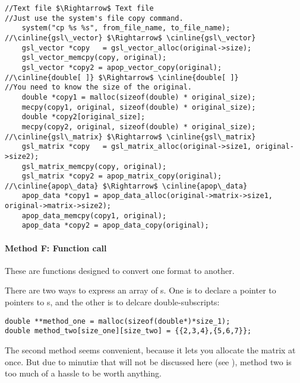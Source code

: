  
  
\begin{lstlisting}
//Text file $\Rightarrow$ Text file
//Just use the system's file copy command.
    system("cp %s %s", from_file_name, to_file_name);
//\cinline{gsl\_vector} $\Rightarrow$ \cinline{gsl\_vector}
    gsl_vector *copy   = gsl_vector_alloc(original->size);
    gsl_vector_memcpy(copy, original);
    gsl_vector *copy2 = apop_vector_copy(original);
//\cinline{double[ ]} $\Rightarrow$ \cinline{double[ ]}
//You need to know the size of the original.
    double *copy1 = malloc(sizeof(double) * original_size);
    mecpy(copy1, original, sizeof(double) * original_size);
    double *copy2[original_size];
    mecpy(copy2, original, sizeof(double) * original_size);
//\cinline{gsl\_matrix} $\Rightarrow$ \cinline{gsl\_matrix}
    gsl_matrix *copy   = gsl_matrix_alloc(original->size1, original->size2);
    gsl_matrix_memcpy(copy, original);
    gsl_matrix *copy2 = apop_matrix_copy(original);
//\cinline{apop\_data} $\Rightarrow$ \cinline{apop\_data}
    apop_data *copy1 = apop_data_alloc(original->matrix->size1, original->matrix->size2);
    apop_data_memcpy(copy1, original);
    apop_data *copy2 = apop_data_copy(original);
\end{lstlisting}

\paragraph{Method F: Function call}
 
 
 

These are functions designed to convert one format to another.

There are two ways to express an array of s. One is to
declare a pointer to pointers to s, and the other is to
delcare double-subscripts:
\begin{lstlisting}
double **method_one = malloc(sizeof(double*)*size_1);
double method_two[size_one][size_two] = {{2,3,4},{5,6,7}};
\end{lstlisting}
The second method seems convenient, because it lets you allocate the
matrix at once. But due to minuti\ae{} that will not be discussed here
(see \citet[p 113]{kandr:c}), method two is too much of a hassle to
be worth anything. 

